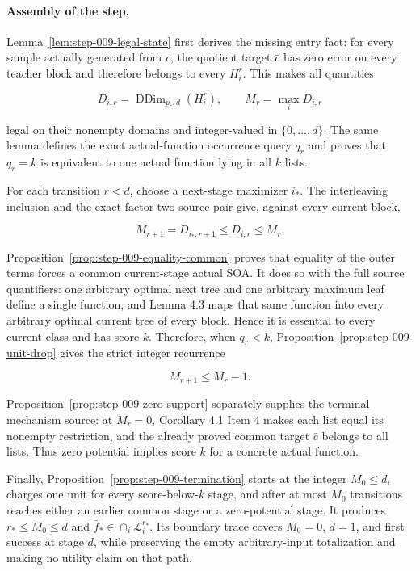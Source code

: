 \paragraph{Assembly of the step.}


Lemma~\ref{lem:step-009-legal-state} first derives the missing entry fact:
for every sample actually generated from \(c\), the quotient target
\(\bar c\) has zero error on every teacher block and therefore belongs to
every \(H_i^r\). This makes all quantities

\[
 D_{i,r}=\operatorname{DDim}_{p_r,d}(H_i^r),
 \qquad M_r=\max_iD_{i,r}
\]

legal on their nonempty domains and integer-valued in
\(\{0,\ldots,d\}\). The same lemma defines the exact actual-function
occurrence query \(q_r\) and proves that \(q_r=k\) is equivalent to one
actual function lying in all \(k\) lists.

For each transition \(r<d\), choose a next-stage maximizer \(i_*\).
The  interleaving inclusion and the exact factor-two source pair
give, against every current block,

\[
 M_{r+1}=D_{i_*,r+1}\le D_{i,r}\le M_r.
\]

Proposition~\ref{prop:step-009-equality-common} proves that equality of the
outer terms forces a common current-stage actual SOA. It does so with the
full source quantifiers: one arbitrary optimal next tree and one arbitrary
maximum leaf define a single function, and Lemma 4.3 maps that same
function into every arbitrary optimal current tree of every block. Hence
it is essential to every current class and has score \(k\). Therefore,
when \(q_r<k\), Proposition~\ref{prop:step-009-unit-drop} gives the strict
integer recurrence

\[
 M_{r+1}\le M_r-1.
\]

Proposition~\ref{prop:step-009-zero-support} separately supplies the
terminal mechanism source: at \(M_r=0\), Corollary 4.1 Item 4 makes each
list equal its nonempty restriction, and the already proved common target
\(\bar c\) belongs to all lists. Thus zero potential implies score \(k\)
for a concrete actual function.

Finally, Proposition~\ref{prop:step-009-termination} starts at the integer
\(M_0\le d\), charges one unit for every score-below-\(k\) stage, and after
at most \(M_0\) transitions reaches either an earlier common stage or a
zero-potential stage. It produces \(r_*\le M_0\le d\) and
\(\bar f_*\in\cap_i\mathcal L_i^{r_*}\). Its boundary trace covers
\(M_0=0\), \(d=1\), and first success at stage \(d\), while preserving the
 empty arbitrary-input totalization and making no utility claim on
that path.

